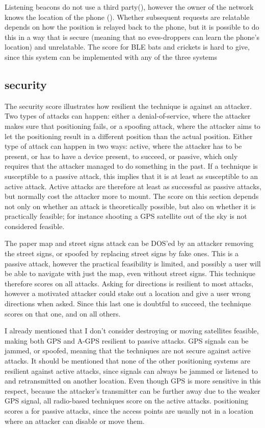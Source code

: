 Listening beacons do not use a third party(\yes), however the owner of the network knows the location of the phone (\no).
Whether subsequent requests are relatable depends on how the position is relayed back to the phone, but it is possible to do this in a way that is secure (meaning that no eves-droppers can learn the phone's location) and unrelatable.
The score for BLE bats and crickets is hard to give, since this system can be implemented with any of the three systems

\subsection{security}
The security score illustrates how resilient the technique is against an attacker.
Two types of attacks can happen: either a denial-of-service, where the attacker makes sure that positioning fails, or a spoofing attack, where the attacker aims to let the positioning result in a different position than the actual position.
Either type of attack can happen in two ways: active, where the attacker has to be present, or has to have a device present, to succeed, or passive, which only requires that the attacker managed to do something in the past.
If a technique is susceptible to a passive attack, this implies that it is at least as susceptible to an active attack.
Active attacks are therefore at least as successful as passive attacks, but normally cost the attacker more to mount.
The score on this section depends not only on whether an attack is theoretically possible, but also on whether it is practically feasible; for instance shooting a GPS satellite out of the sky is not considered feasible.

The paper map and street signs attack can be DOS'ed by an attacker removing the street signs, or spoofed by replacing street signs by fake ones.
This is a passive attack, however the practical feasibility is limited, and possibly a user will be able to navigate with just the map, even without street signs.
This technique therefore scores \maybe on all attacks.
Asking for directions is resilient to most attacks, however a motivated attacker could stake out a location and give a user wrong directions when asked.
Since this last one is doubtful to succeed, the technique scores \maybe on that one, and \yes on all others.

I already mentioned that I don't consider destroying or moving satellites feasible, making both GPS and A-GPS resilient to passive attacks.
GPS signals can be jammed\citep{grant2009gps}, or spoofed\citep{tippenhauer2011requirements}, meaning that the techniques are not secure against active attacks.
It should be mentioned that none of the other positioning systems are resilient against active attacks, since signals can always be jammed or listened to and retransmitted on another location.
Even though GPS is more sensitive in this respect, because the attacker's transmitter can be further away due to the weaker GPS signal, all radio-based techniques score \no on the active attacks.
\Wifi positioning scores a \maybe for passive attacks, since the \wifi access points are usually not in a location where an attacker can disable or move them.


